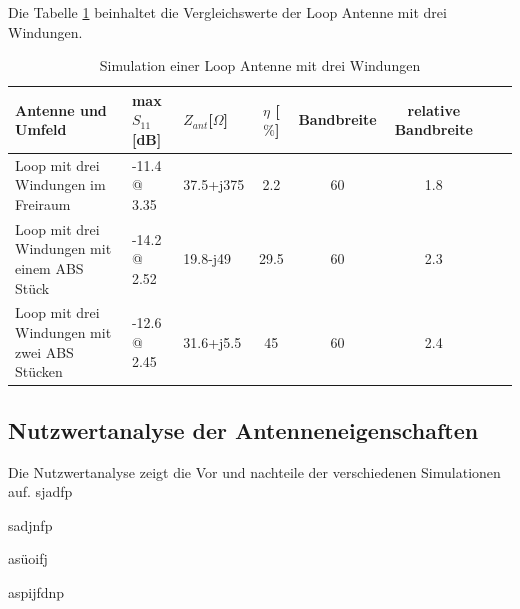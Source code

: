 Die Tabelle \ref{tab:Evaluation_Vergeich_Loop_Antennen_Coil} beinhaltet die Vergleichswerte der Loop Antenne mit drei Windungen.
\begin{table}[!h]
  \centering
  \begin{tabular}{p{4cm} p{2cm} l  c c c c r} 
  \toprule 
  Antenne und Umfeld             & max $S_{11}$[dB]		& $Z_{ant}$[$\Omega$] 	& $\eta$ [$\%$] & Bandbreite & relative Bandbreite\\ 
  \midrule
Loop mit drei Windungen  im Freiraum    		&	-11.4 @ 3.35		&  	37.5+j375			&   	2.2	& 60		& 1.8\\          					   		
Loop mit drei Windungen mit einem ABS Stück 	&    -14.2 @ 2.52  		&	19.8-j49			&	29.5	& 60	 	& 2.3\\
Loop mit drei Windungen mit zwei ABS Stücken &    -12.6 @ 2.45    	&	31.6+j5.5		&	45	& 60 	& 2.4\\
 \bottomrule
  \end{tabular}
  \caption{Simulation einer Loop Antenne mit drei Windungen }
  \label{tab:Evaluation_Vergeich_Loop_Antennen_Coil}
\end{table}
\subsection{Nutzwertanalyse der Antenneneigenschaften }

Die Nutzwertanalyse zeigt die Vor und nachteile der verschiedenen Simulationen auf.
sjadfp

sadjnfp

asüoifj

aspijfdnp


